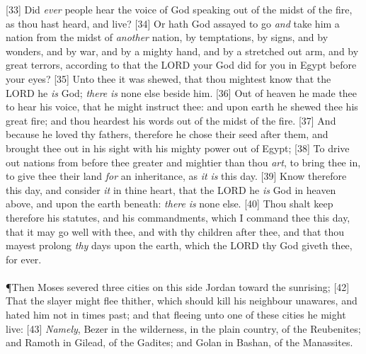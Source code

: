 [33] \textcolor[cmyk]{0.99998,1,0,0}{Did \emph{ever} people hear the voice of God speaking out of the midst of the fire, as thou hast heard, and live?}
[34] \textcolor[cmyk]{0.99998,1,0,0}{Or hath God assayed to go \emph{and} take him a nation from the midst of \emph{another} nation, by temptations, by signs, and by wonders, and by war, and by a mighty hand, and by a stretched out arm, and by great terrors, according to  that the LORD your God did for you in Egypt before your eyes?}
[35] \textcolor[cmyk]{0.99998,1,0,0}{Unto thee it was shewed, that thou mightest know that the LORD he \emph{is} God; \emph{there} \emph{is} none else beside him.}
[36] \textcolor[cmyk]{0.99998,1,0,0}{Out of heaven he made thee to hear his voice, that he might instruct thee: and upon earth he shewed thee his great fire; and thou heardest his words out of the midst of the fire.}
[37] \textcolor[cmyk]{0.99998,1,0,0}{And because he loved thy fathers, therefore he chose their seed after them, and brought thee out in his sight with his mighty power out of Egypt;}
[38] \textcolor[cmyk]{0.99998,1,0,0}{To drive out nations from before thee greater and mightier than thou \emph{art}, to bring thee in, to give thee their land \emph{for} an inheritance, as \emph{it} \emph{is} this day.}
[39] \textcolor[cmyk]{0.99998,1,0,0}{Know therefore this day, and   {consider} \emph{it} in thine heart, that the LORD he \emph{is} God in heaven above, and upon the earth beneath: \emph{there} \emph{is} none else.}
[40] \textcolor[cmyk]{0.99998,1,0,0}{Thou shalt keep therefore his statutes, and his   {commandments}, which I   {command} thee this day, that it may go well with thee, and with thy children after thee, and that thou mayest prolong \emph{thy} days upon the earth, which the LORD thy God giveth thee, for ever.}\\
\\
\P \textcolor[cmyk]{0.99998,1,0,0}{Then Moses severed three   {cities} on this side Jordan toward the sunrising;}
[42] \textcolor[cmyk]{0.99998,1,0,0}{That the slayer might flee thither, which should kill his neighbour unawares, and hated him not in times past; and that fleeing unto one of these   {cities} he might live:}
[43] \textcolor[cmyk]{0.99998,1,0,0}{\emph{Namely}, Bezer in the wilderness, in the plain country, of the Reubenites; and Ramoth in Gilead, of the Gadites; and Golan in Bashan, of the Manassites.}\\
\\
